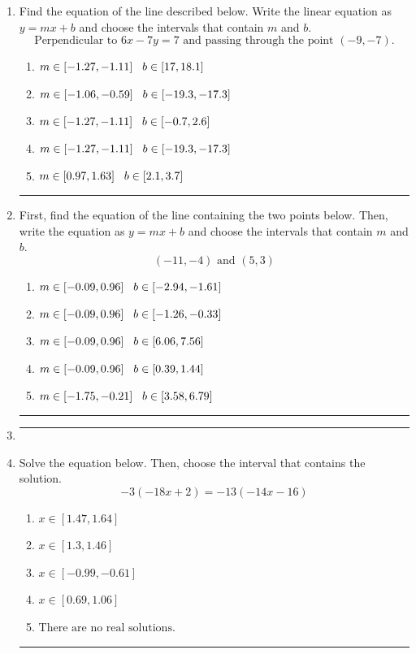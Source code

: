 \documentclass[14pt]{extbook}
\newcommand{\litem}[1]{\item#1\hspace*{-1cm}\rule{\textwidth}{0.4pt}}
\begin{document}
\begin{enumerate}
{\begin{enumerate}[label=\Alph*.]
\end{enumerate} }
\litem{
Find the equation of the line described below. Write the linear equation as $ y=mx+b $ and choose the intervals that contain $m$ and $b$.\[ \text{Perpendicular to } 6 x - 7 y = 7 \text{ and passing through the point } (-9, -7). \]\begin{enumerate}[label=\Alph*.]
\item \( m \in [-1.27, -1.11] \hspace*{3mm} b \in [17, 18.1] \)
\item \( m \in [-1.06, -0.59] \hspace*{3mm} b \in [-19.3, -17.3] \)
\item \( m \in [-1.27, -1.11] \hspace*{3mm} b \in [-0.7, 2.6] \)
\item \( m \in [-1.27, -1.11] \hspace*{3mm} b \in [-19.3, -17.3] \)
\item \( m \in [0.97, 1.63] \hspace*{3mm} b \in [2.1, 3.7] \)

\end{enumerate} }
\litem{
First, find the equation of the line containing the two points below. Then, write the equation as $ y=mx+b $ and choose the intervals that contain $m$ and $b$.\[ (-11, -4) \text{ and } (5, 3) \]\begin{enumerate}[label=\Alph*.]
\item \( m \in [-0.09, 0.96] \hspace*{3mm} b \in [-2.94, -1.61] \)
\item \( m \in [-0.09, 0.96] \hspace*{3mm} b \in [-1.26, -0.33] \)
\item \( m \in [-0.09, 0.96] \hspace*{3mm} b \in [6.06, 7.56] \)
\item \( m \in [-0.09, 0.96] \hspace*{3mm} b \in [0.39, 1.44] \)
\item \( m \in [-1.75, -0.21] \hspace*{3mm} b \in [3.58, 6.79] \)

\end{enumerate} }
\litem{
\begin{enumerate}[label=\Alph*.]

\end{enumerate} }
\litem{
Solve the equation below. Then, choose the interval that contains the solution.\[ -3(-18x + 2) = -13(-14x -16) \]\begin{enumerate}[label=\Alph*.]
\item \( x \in [1.47, 1.64] \)
\item \( x \in [1.3, 1.46] \)
\item \( x \in [-0.99, -0.61] \)
\item \( x \in [0.69, 1.06] \)
\item \( \text{There are no real solutions.} \)


\end{enumerate}}
\end{enumerate}
\end{document}
